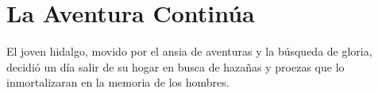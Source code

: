 \chapter{La Aventura Continúa}
El joven hidalgo, movido por el ansia de aventuras y la búsqueda de gloria, decidió un día salir de su hogar en busca de hazañas y proezas que lo inmortalizaran en la memoria de los hombres.

